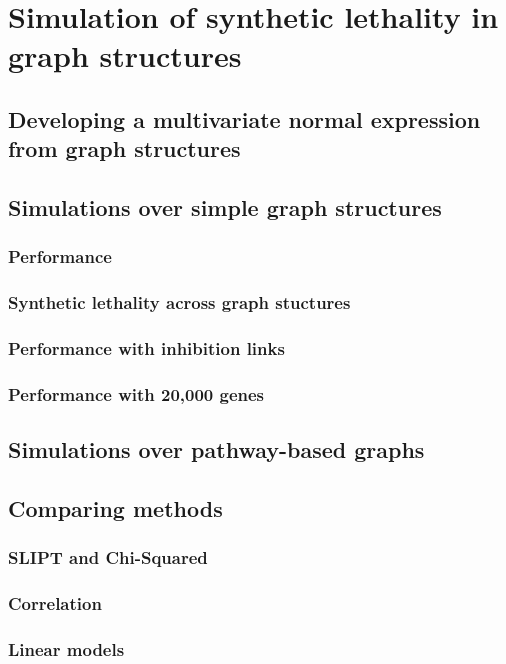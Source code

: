 \section{Simulation of synthetic lethality in graph structures}

\subsection{Developing a multivariate normal expression from graph structures}

\subsection{Simulations over simple graph structures}
\subsubsection{Performance}
\subsubsection{Synthetic lethality across graph stuctures}
\subsubsection{Performance with inhibition links}
\subsubsection{Performance with 20,000 genes}

\subsection{Simulations over pathway-based graphs}

\subsection{Comparing methods}
\subsubsection{SLIPT and Chi-Squared}
\subsubsection{Correlation}
\subsubsection{Linear models}

